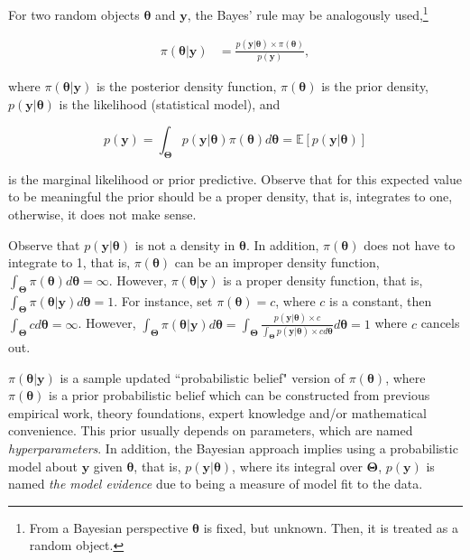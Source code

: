 For two random objects $\mathbf{\theta}$ and $\mathbf{y}$, the Bayes' rule may be analogously used,\footnote{From a Bayesian perspective $\mathbf{\theta}$ is fixed, but unknown. Then, it is treated as a random object.}

\begin{align}
	\pi(\mathbf{\theta}|\mathbf{y})&=\frac{p(\mathbf{y}|\mathbf{\theta}) \times \pi(\mathbf{\theta})}{p(\mathbf{y})},
	\label{eq:121}
\end{align}

where $\pi(\mathbf{\theta}|\mathbf{y})$ is the posterior density function, $\pi(\mathbf{\theta})$ is the prior density, $p(\mathbf{y}|\mathbf{\theta})$ is the likelihood (statistical model), and

\begin{equation}
	p(\mathbf{y})=\int_{\mathbf{\Theta}}p(\mathbf{y}|\mathbf{\theta})\pi(\mathbf{\theta})d\mathbf{\theta}=\mathbb{E}\left[p(\mathbf{y}|\mathbf{\theta})\right]
	\label{eq:121a}
\end{equation}

is the marginal likelihood or prior predictive. Observe that for this expected value to be meaningful the prior should be a proper density, that is, integrates to one, otherwise, it does not make sense. 

Observe that $p(\mathbf{y}|\mathbf{\theta})$ is not a density in $\mathbf{\theta}$. In addition, $\pi(\mathbf{\theta})$ does not have to integrate to 1, that is, $\pi(\mathbf{\theta})$ can be an improper density function, $\int_{\mathbf{\Theta}}\pi(\mathbf{\theta})d\mathbf{\theta}=\infty$. However, $\pi(\mathbf{\theta}|\mathbf{y})$ is a proper density function, that is, $\int_{\mathbf{\Theta}}\pi(\mathbf{\theta}|\mathbf{y})d\mathbf{\theta}=1$. For instance, set $\pi(\mathbf{\theta})=c$, where $c$ is a constant, then $\int_{\mathbf{\Theta}}cd\mathbf{\theta}=\infty$. However, $\int_{\mathbf{\Theta}}\pi(\mathbf{\theta}|\mathbf{y})d\mathbf{\theta}=\int_{\mathbf{\Theta}}\frac{p(\mathbf{y}|\mathbf{\theta})\times c}{\int_{\mathbf{\Theta}} p(\mathbf{y}|\mathbf{\theta})\times c d\mathbf{\theta}}d\mathbf{\theta}=1$ where $c$ cancels out.  

$\pi(\mathbf{\theta}|\mathbf{y})$ is a sample updated ``probabilistic belief" version of $\pi(\mathbf{\theta})$, where $\pi(\mathbf{\theta})$ is a prior probabilistic belief which can be constructed from previous empirical work, theory foundations, expert knowledge and/or mathematical convenience. This prior usually depends on parameters, which are named \textit{hyperparameters}. In addition, the Bayesian approach implies using a probabilistic model about $\mathbf{y}$ given $\mathbf{\theta}$, that is, $p(\mathbf{y}|\mathbf{\theta})$, where its integral over $\mathbf{\Theta}$, $p(\mathbf{y})$ is named \textit{the model evidence} due to being a measure of model fit to the data.

